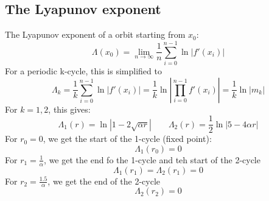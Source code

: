 \documentclass{article}
\begin{document}
\subsection{The Lyapunov exponent}
The Lyapunov exponent of a orbit starting from $x_0$:
\begin{equation}
    \Lambda (x_0) = \lim_{n \rightarrow \infty} \frac{1}{n} \sum_{i=0}^{n-1} \ln\left|f'(x_i)\right|
\end{equation}
For a periodic k-cycle, this is simplified to
\begin{equation}
    \Lambda_k = \frac{1}{k} \sum_{i=0}^{n-1} \ln\left|f'(x_i)\right| = \frac{1}{k} \ln\left|\prod_{i=0}^{n-1} f'(x_i)\right| = \frac{1}{k} \ln\left|m_k\right|
\end{equation}
For $k = 1, 2$, this gives:
\begin{equation}
    \Lambda_1(r) = \ln|1 - 2\sqrt{\alpha r}|
    \qquad
    \Lambda_2(r) = \frac{1}{2}\ln|5 - 4\alpha r|
\end{equation}
For $r_0 = 0$, we get the start of the 1-cycle (fixed point):
\begin{equation}
    \Lambda_1(r_0) = 0
\end{equation}
For $r_1 = \frac{1}{\alpha}$, we get the end fo the 1-cycle and teh start of the 2-cycle
\begin{equation}
    \Lambda_1(r_1) = \Lambda_2(r_1) = 0
\end{equation}
For $r_2 = \frac{1.5}{\alpha}$, we get the end of the 2-cycle
\begin{equation}
    \Lambda_2(r_2) = 0
\end{equation}
\end{document}
